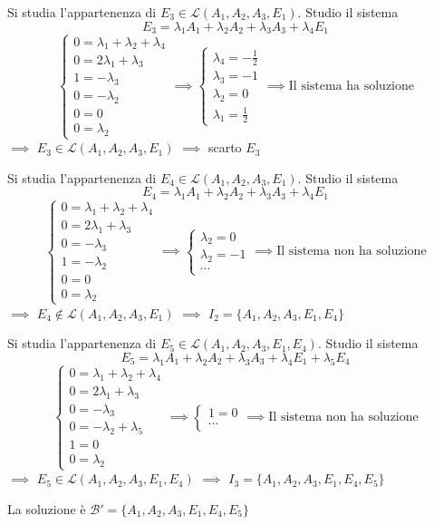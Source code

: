 \documentclass[twoside, 11pt, titlepage]{article}
\begin{document}
{Si studia l'appartenenza di $E_3\in\mathscr{L}(A_1, A_2, A_3, E_1)$. Studio il sistema
\[
E_3=\lambda_1 A_1 + \lambda_2 A_2+ \lambda_3A_3+\lambda_4E_1
\]
\[
\begin{cases}
0=\lambda_1+\lambda_2+\lambda_4\\
0=2\lambda_1+\lambda_3\\
1=-\lambda_3\\
0=-\lambda_2\\
0=0\\
0=\lambda_2
\end{cases}\implies \begin{cases}
\lambda_4=-\frac{1}{2}\\
\lambda_3=-1\\
\lambda_2=0\\
\lambda_1=\frac{1}{2}
\end{cases}\implies\text{Il sistema ha soluzione}
\]$\implies$ $E_3\in\mathscr{L}(A_1, A_2, A_3, E_1)$ $\implies$ scarto $E_3$

Si studia l'appartenenza di $E_4\in\mathscr{L}(A_1, A_2, A_3, E_1)$. Studio il sistema
\[
E_4=\lambda_1 A_1 + \lambda_2 A_2+ \lambda_3A_3+\lambda_4 E_1
\]
\[
\begin{cases}
0=\lambda_1+\lambda_2+\lambda_4\\
0=2\lambda_1+\lambda_3\\
0=-\lambda_3\\
1=-\lambda_2\\
0=0\\
0=\lambda_2
\end{cases}\implies \begin{cases}
\lambda_2=0\\
\lambda_2=-1\\
\cdots
\end{cases}\implies\text{Il sistema non ha soluzione}
\]$\implies$ $E_4\notin\mathscr{L}(A_1, A_2, A_3, E_1)$ $\implies$ $I_2=\{A_1, A_2, A_3, E_1, E_4\}$

Si studia l'appartenenza di $E_5\in\mathscr{L}(A_1, A_2, A_3, E_1, E_4)$. Studio il sistema
\[
E_5=\lambda_1 A_1 + \lambda_2 A_2+ \lambda_3A_3+\lambda_4 E_1 +\lambda_5 E_4
\]
\[
\begin{cases}
0=\lambda_1+\lambda_2+\lambda_4\\
0=2\lambda_1+\lambda_3\\
0=-\lambda_3\\
0=-\lambda_2+\lambda_5\\
1=0\\
0=\lambda_2
\end{cases}\implies \begin{cases}
1=0\\
\cdots
\end{cases}\implies\text{Il sistema non ha soluzione}
\]$\implies$ $E_5\in\mathscr{L}(A_1, A_2, A_3, E_1, E_4)$ $\implies$ $I_3=\{A_1, A_2, A_3, E_1, E_4, E_5\}$

La soluzione è $\mathscr{B}'=\{A_1, A_2, A_3, E_1, E_4, E_5\}$
}
\end{document}
